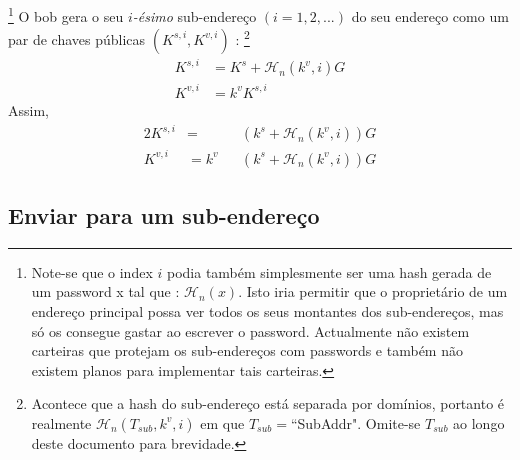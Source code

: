 \footnote{Note-se que o index $i$ podia também simplesmente ser uma hash gerada de um password x tal que : $\mathcal{H}_n(x)$. Isto iria permitir que o proprietário de um endereço principal possa ver todos os seus montantes dos sub-endereços, mas só os consegue gastar ao escrever o password. Actualmente não existem carteiras que protejam os sub-endereços com passwords e também não existem planos para implementar tais carteiras.}
O bob gera o seu $i${\em -ésimo} sub-endereço $(i = 1, 2, ...)$ do seu endereço como um par de chaves públicas $(K^{s,i}, K^{v,i})$ :
\footnote{Acontece que a hash do sub-endereço está separada por domínios, portanto é realmente $\mathcal{H}_n(T_{sub},k^v,i)$ em que $T_{sub} = $``SubAddr". Omite-se $T_{sub}$ ao longo deste documento para brevidade.}
\begin{align*}
    K^{s,i} &= K^s + \mathcal{H}_n(k^v, i) G\\
    K^{v,i} &= k^v K^{s,i}
\end{align*}
\quad Assim,
\begin{alignat*}{2}
    K^{s,i} &= &&(k^s + \mathcal{H}_n(k^v, i))G\\    
    K^{v,i} &= k^v&&(k^s + \mathcal{H}_n(k^v, i))G
\end{alignat*}
    

\subsection{Enviar para um sub-endereço}
    
